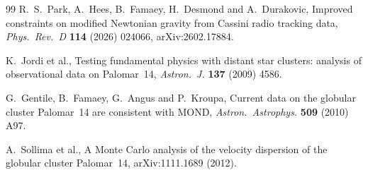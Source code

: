 \documentclass[twocolumn]{iopjournal}
\begin{document}
\begin{thebibliography}{99}
R.~S.~Park, A.~Hees, B.~Famaey, H.~Desmond and A.~Durakovic, Improved
constraints on modified Newtonian gravity from Cassini radio tracking
data, \textit{Phys.\ Rev.\ D} \textbf{114} (2026) 024066,
arXiv:2602.17884.

K.~Jordi et al., Testing fundamental physics with distant star
clusters: analysis of observational data on Palomar~14,
\textit{Astron.\ J.} \textbf{137} (2009) 4586.

G.~Gentile, B.~Famaey, G.~Angus and P.~Kroupa, Current data on the
globular cluster Palomar~14 are consistent with MOND,
\textit{Astron.\ Astrophys.} \textbf{509} (2010) A97.

A.~Sollima et al., A Monte Carlo analysis of the velocity dispersion of
the globular cluster Palomar~14, arXiv:1111.1689 (2012).

\end{thebibliography}
\end{document}
